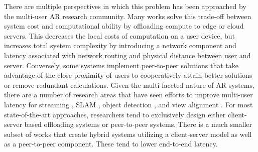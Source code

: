 \documentclass{vgtc}                          %
\begin{document}
There are multiple perspectives in which this problem has been approached by the multi-user AR research community.
Many works solve this trade-off between system cost and computational ability by offloading compute to edge or 
cloud servers. This decreases the local  costs of computation on a user device, but increases 
total system complexity by introducing a network component and latency associated with network routing and 
physical distance between user and server. Conversely, some systems implement peer-to-peer solutions that take advantage 
of the close proximity of users to cooperatively attain better solutions or remove redundant calculations.
Given the multi-faceted nature of AR systems, there are a number of research areas that have seen efforts to improve
multi-user latency for streaming \cite{intelli-ar}, SLAM \cite{SLAMShare}, object detection \cite{SEAR}\cite{Nimbus}, 
and view alignment \cite{communication-efficient-spatially-consistent}\cite{ARLight}. For most state-of-the-art approaches, researchers
tend to exclusively design either client-server based offloading systems or peer-to-peer systems. There is a much smaller 
subset of works that create hybrid systems utilizing a client-server model as well as a peer-to-peer component. These 
tend to lower end-to-end latency\cite{SCAXR}\cite{SEAR}. 

\end{document}
